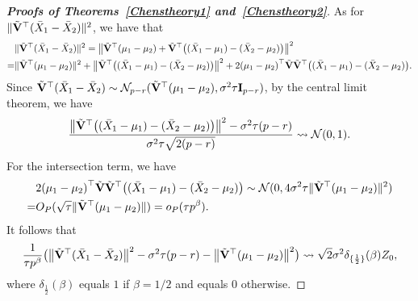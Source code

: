 \documentclass[times,sort&compress,3p]{elsarticle}
\theoremstyle{plain}
\theoremstyle{definition}
\theoremstyle{remark}
\begin{document}
\begin{appendices}
\begin{proof}[\textbf{Proofs of Theorems~\ref{Chenstheory1} and~\ref{Chenstheory2}}]
    As for $\|\tilde{\mathbf{V}}^\top (\bar{X}_1-\bar{X}_2)\|^2$, we have that
        $$
        \begin{aligned}
            &\|\tilde{\mathbf{V}}^\top (\bar{X}_1-\bar{X}_2)\|^2
            =\big\|\tilde{\mathbf{V}}^\top (\mu_1-\mu_2)+\tilde{\mathbf{V}}^\top \big((\bar{X}_1-\mu_1)-(\bar{X}_2-\mu_2)\big)\big\|^2\\
            =&\|\tilde{\mathbf{V}}^\top (\mu_1-\mu_2)\|^2+
            \big\|\tilde{\mathbf{V}}^\top \big((\bar{X}_1-\mu_1)-(\bar{X}_2-\mu_2)\big)\big\|^2+
            2{(\mu_1-\mu_2)}^\top \tilde{\mathbf{V}}\tilde{\mathbf{V}}^\top \big((\bar{X}_1-\mu_1)-(\bar{X}_2-\mu_2)\big).
        \end{aligned}
        $$
Since $\tilde{\mathbf{V}}^\top  (\bar{X}_1-\bar{X}_2)\sim \mathcal{N}_{p-r}(\tilde{\mathbf{V}}^\top  (\mu_1-\mu_2),  \sigma^2 \tau \mathbf{I}_{p-r})$, by the central limit theorem, we have
    $$
\frac{
    \big\|\tilde{\mathbf{V}}^\top \big((\bar{X}_1-\mu_1)-(\bar{X}_2-\mu_2)\big)\big\|^2-\sigma^2 \tau (p-r)}{\sigma^2 \tau\sqrt{2(p-r)}}\rightsquigarrow  \mathcal{N}(0,1).
    $$
    For the intersection term, we have
    \begin{equation*}
        \begin{aligned}
            &2{(\mu_1-\mu_2)}^\top \tilde{\mathbf{V}}\tilde{\mathbf{V}}^\top \big((\bar{X}_1-\mu_1)-(\bar{X}_2-\mu_2)\big)
            \sim \mathcal{N}(0,4\sigma^2 \tau \|\tilde{\mathbf{V}}^\top (\mu_1-\mu_2)\|^2)\\
            =& O_P(\sqrt{\tau}\|\tilde{\mathbf{V}}^\top (\mu_1-\mu_2)\| )=o_P(\tau p^{\beta}).
        \end{aligned}
    \end{equation*}
    It follows that
    \begin{equation}\label{eq:kkk3}
\frac{1}{\tau p^\beta}
    \big(\big\|\tilde{\mathbf{V}}^\top (\bar{X}_1-\bar{X}_2)\big\|^2-\sigma^2 \tau (p-r)-\big\|\tilde{\mathbf{V}}^\top (\mu_1-\mu_2)\big\|^2\big)
    \rightsquigarrow  
        \sqrt{2}\sigma^2 \delta_{\{\frac{1}{2}\}}(\beta)Z_0,
    \end{equation}
    where $\delta_{\frac{1}{2}}(\beta)$ equals $1$ if $\beta=1/2$ and equals $0$ otherwise.



\end{proof}
\end{appendices}
\end{document}
